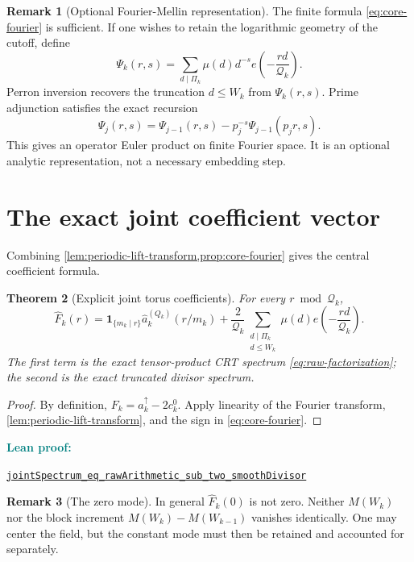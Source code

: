 \documentclass[11pt]{article}
\newtheorem{theorem}{Theorem}[section]
\theoremstyle{definition}
\newtheorem{remark}[theorem]{Remark}
\newcommand{\one}{\mathbf 1}
\newcommand{\leanxref}[3]{%
  \par\smallskip
  {\small\noindent\textcolor{teal}{\textbf{#1:}}\par
  \noindent\href{#3}{\nolinkurl{#2}}\par}
  \smallskip
}
\begin{document}
\begin{remark}[Optional Fourier-Mellin representation]
The finite formula \eqref{eq:core-fourier} is sufficient.  If one wishes to retain the logarithmic geometry of the cutoff, define
\[
\Psi_k(r,s)=\sum_{d\mid\Pi_k}\mu(d)d^{-s}e\!\left(-\frac{rd}{\mathcal Q_k}\right).
\]
Perron inversion recovers the truncation $d\le W_k$ from $\Psi_k(r,s)$.  Prime adjunction satisfies the exact recursion
\[
\Psi_j(r,s)=\Psi_{j-1}(r,s)-p_j^{-s}\Psi_{j-1}(p_jr,s).
\]
This gives an operator Euler product on finite Fourier space.  It is an optional analytic representation, not a necessary embedding step.
\end{remark}

\section{The exact joint coefficient vector}

Combining \cref{lem:periodic-lift-transform,prop:core-fourier} gives the central coefficient formula.

\begin{theorem}[Explicit joint torus coefficients]\label{thm:joint-coefficients}
For every $r\bmod\mathcal Q_k$,
\begin{equation}\label{eq:joint-coefficients}
\boxed{
\widehat F_k(r)
=
\one_{\{m_k\mid r\}}
\widehat a_k^{(Q_k)}(r/m_k)
+
\frac{2}{\mathcal Q_k}
\sum_{\substack{d\mid\Pi_k\\d\le W_k}}
\mu(d)e\!\left(-\frac{rd}{\mathcal Q_k}\right).}
\end{equation}
The first term is the exact tensor-product CRT spectrum \eqref{eq:raw-factorization}; the second is the exact truncated divisor spectrum.
\end{theorem}

\begin{proof}
By definition, $F_k=a_k^{\uparrow}-2c_k^0$.  Apply linearity of the Fourier transform, \cref{lem:periodic-lift-transform}, and the sign in \eqref{eq:core-fourier}.
\end{proof}
\leanxref{Lean proof}{jointSpectrum_eq_rawArithmetic_sub_two_smoothDivisor}{https://github.com/OVVO-Financial/prime-wheel-mobius/blob/main/formalization/RHLean/Analysis/PrimeWheelArithmeticSpectrum.lean}

\begin{remark}[The zero mode]
In general $\widehat F_k(0)$ is not zero.  Neither $M(W_k)$ nor the block increment $M(W_k)-M(W_{k-1})$ vanishes identically.  One may center the field, but the constant mode must then be retained and accounted for separately.
\end{remark}
\end{document}
